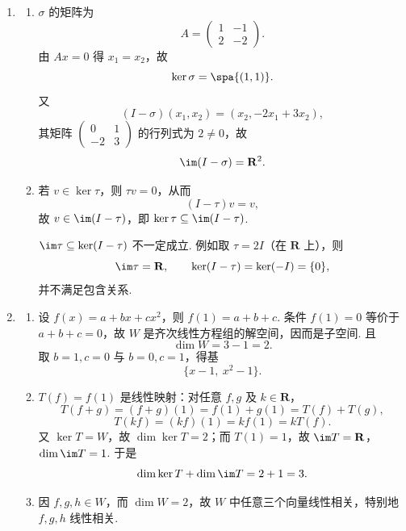 \begin{enumerate}
    \item
    \begin{enumerate}
        \item $\sigma$ 的矩阵为
        \[
            A=\begin{pmatrix}
                1&-1\\
                2&-2
            \end{pmatrix}.
        \]
        由 $Ax=0$ 得 $x_1=x_2$，故
        \[
            \ker\sigma=\spa\{(1,1)\}.
        \]
        又
        \[
            (I-\sigma)(x_1,x_2)=(x_2,-2x_1+3x_2),
        \]
        其矩阵 $\begin{pmatrix}0&1\\-2&3\end{pmatrix}$ 的行列式为 $2\neq 0$，故
        \[
            \im(I-\sigma)=\mathbf{R}^2.
        \]

        \item 若 $v\in\ker\tau$，则 $\tau v=0$，从而
        \[
            (I-\tau)v=v,
        \]
        故 $v\in\im(I-\tau)$，即 $\ker\tau\subseteq\im(I-\tau)$.

        $\im\tau\subseteq\ker(I-\tau)$ 不一定成立. 例如取 $\tau=2I$（在 $\mathbf{R}$ 上），则
        \[
            \im\tau=\mathbf{R},\qquad
            \ker(I-\tau)=\ker(-I)=\{0\},
        \]
        并不满足包含关系.
    \end{enumerate}

    \item
    \begin{enumerate}
        \item 设 $f(x)=a+bx+cx^2$，则 $f(1)=a+b+c$. 条件 $f(1)=0$ 等价于 $a+b+c=0$，故 $W$ 是齐次线性方程组的解空间，因而是子空间. 且
        \[
            \dim W=3-1=2.
        \]
        取 $b=1,c=0$ 与 $b=0,c=1$，得基
        \[
            \{x-1,\ x^2-1\}.
        \]

        \item $T(f)=f(1)$ 是线性映射：对任意 $f,g$ 及 $k\in\mathbf{R}$，
        \[
            T(f+g)=(f+g)(1)=f(1)+g(1)=T(f)+T(g),
        \]
        \[
            T(kf)=(kf)(1)=kf(1)=kT(f).
        \]
        又 $\ker T=W$，故 $\dim\ker T=2$；而 $T(1)=1$，故 $\im T=\mathbf{R}$，$\dim\im T=1$. 于是
        \[
            \dim\ker T+\dim\im T=2+1=3.
        \]

        \item 因 $f,g,h\in W$，而 $\dim W=2$，故 $W$ 中任意三个向量线性相关，特别地 $f,g,h$ 线性相关.
    \end{enumerate}


\end{enumerate}
